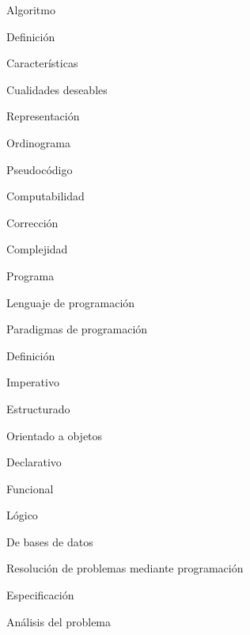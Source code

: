 \begin{longenum}
\begin{longenum}
\begin{longenum}
            \item Algoritmo
            \begin{longenum}
                \item Definición
                \item Características
                \item Cualidades deseables
                \item Representación
                \begin{longenum}
                    \item Ordinograma
                    \item Pseudocódigo
                \end{longenum}
                \item Computabilidad
                \item Corrección
                \item Complejidad
            \end{longenum}
            \item Programa
            \item Lenguaje de programación
        \end{longenum}
        \item Paradigmas de programación
        \begin{longenum}
            \item Definición
            \item Imperativo
            \begin{longenum}
                \item Estructurado
                \item Orientado a objetos
            \end{longenum}
            \item Declarativo
            \begin{longenum}
                \item Funcional
                \item Lógico
                \item De bases de datos
            \end{longenum}
        \end{longenum}
        \item Resolución de problemas mediante programación
        \begin{longenum}
            \item Especificación
            \item Análisis del problema

\end{longenum}
\end{longenum}
\end{longenum}
